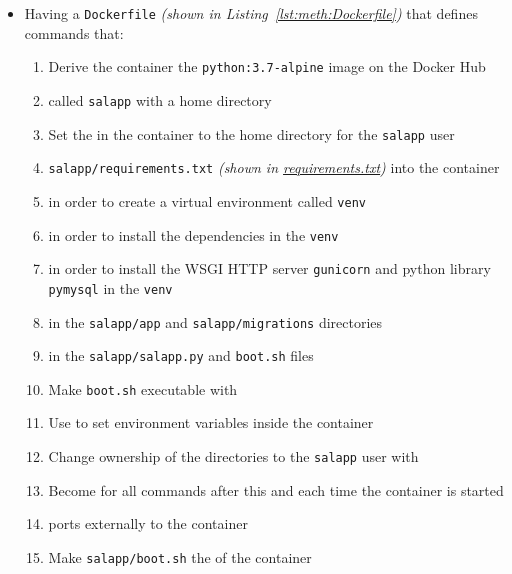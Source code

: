 \begin{enumerate}[leftmargin=0em,label=\protect\listlabelcircle{\arabic*}]
\begin{enumerate}[label=\Roman*~\textcolor{light-gray}{|}]
\begin{itemize}
          \item Having a \texttt{Dockerfile} \textit{(shown in Listing~\ref{lst:meth:Dockerfile})} that defines commands that:
            \begin{enumerate}[label=\roman*\textasciitilde]
              \item Derive the container  the \texttt{python:3.7-alpine} image on the Docker Hub
              \item {} called \texttt{salapp} with a home directory
              \item Set the  in the container to the home directory for the \texttt{salapp} user
              \item {} \texttt{salapp/requirements.txt} \textit{(shown in \hyperref[fcl:salapp:requirements]{requirements.txt})} into the container
              \item {} in order to create a virtual environment called \texttt{venv}
              \item {} in order to install the dependencies in the \texttt{venv}
              \item {} in order to install the WSGI HTTP server \texttt{gunicorn} and python library \texttt{pymysql} in the \texttt{venv}
              \item {} in the \texttt{salapp/app} and \texttt{salapp/migrations} directories
              \item {} in the \texttt{salapp/salapp.py} and \texttt{boot.sh} files
              \item Make \texttt{boot.sh} executable with 
              \item Use  to set environment variables inside the container
              \item Change ownership of the directories to the \texttt{salapp} user with 
              \item Become  for all commands after this and each time the container is started
              \item {} ports externally to the container
              \item Make \texttt{salapp/boot.sh} the  of the container

\end{enumerate}
\end{itemize}
\end{enumerate}
\end{enumerate}

